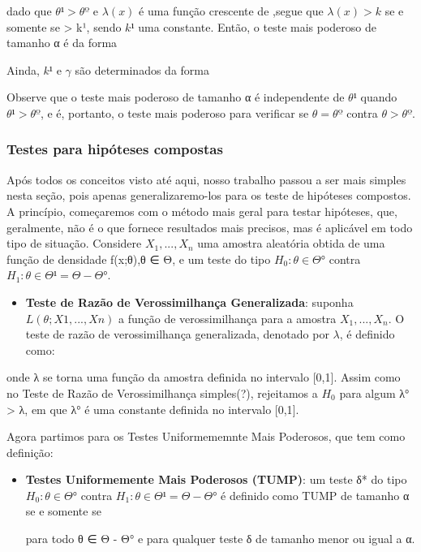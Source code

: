 \documentclass[
]{article}
\providecommand{\tightlist}{%
  \setlength{\itemsep}{0pt}\setlength{\parskip}{0pt}}
\begin{document}
dado que \(θ¹ > θº\) e \(λ(x)\) é uma função crescente de ,segue que
\(λ(x) > k\) se e somente se \textgreater{} k¹, sendo \(k¹\) uma
constante. Então, o teste mais poderoso de tamanho α é da forma

Ainda, \(k¹\) e \(γ\) são determinados da forma

Observe que o teste mais poderoso de tamanho α é independente de \(θ¹\)
quando \(θ¹ > θº\), e é, portanto, o teste mais poderoso para verificar
se \(θ = θº\) contra \(θ > θº\).

\hypertarget{testes-para-hipuxf3teses-compostas}{%
\subsubsection{Testes para hipóteses
compostas}\label{testes-para-hipuxf3teses-compostas}}

Após todos os conceitos visto até aqui, nosso trabalho passou a ser mais
simples nesta seção, pois apenas generalizaremo-los para os teste de
hipóteses compostos. A princípio, começaremos com o método mais geral
para testar hipóteses, que, geralmente, não é o que fornece resultados
mais precisos, mas é aplicável em todo tipo de situação. Considere
\(X_1,...,X_n\) uma amostra aleatória obtida de uma função de densidade
f(x;θ),θ ∈ Θ, e um teste do tipo \(H_0: θ ∈ Θ°\) contra
\(H_1: θ ∈ Θ¹ = Θ - Θ°\).

\begin{itemize}
\tightlist
\item
  \textbf{Teste de Razão de Verossimilhança Generalizada}: suponha
  \(L(θ;X1,...,Xn)\) a função de verossimilhança para a amostra
  \(X_1,...,X_n\). O teste de razão de verossimilhança generalizada,
  denotado por \(λ\), é definido como:
\end{itemize}

onde λ se torna uma função da amostra definida no intervalo {[}0,1{]}.
Assim como no Teste de Razão de Verossimilhança simples(?), rejeitamos a
\(H_0\) para algum λ° \textgreater{} λ, em que λ° é uma constante
definida no intervalo {[}0,1{]}.

Agora partimos para os Testes Uniformememnte Mais Poderosos, que tem
como definição:

\begin{itemize}
\item
  \textbf{Testes Uniformemente Mais Poderosos (TUMP)}: um teste δ* do
  tipo \(H_0: θ ∈ Θ°\) contra \(H_1: θ ∈ Θ¹ = Θ - Θ°\) é definido como
  TUMP de tamanho α se e somente se

  para todo θ ∈ Θ - Θ° e para qualquer teste δ de tamanho menor ou igual
  a α.
\end{itemize}
\end{document}
